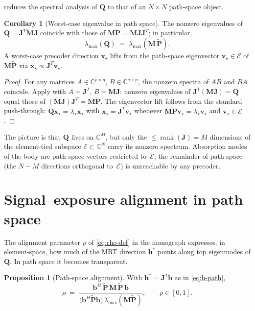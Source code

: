 \documentclass[11pt,a4paper]{article}
\theoremstyle{definition}
\newtheorem{proposition}[proposition]{Proposition}
\newtheorem{corollary}[corollary]{Corollary}
\newcommand{\Complex}{\mathbb{C}}
\newcommand{\Jmat}{\mathbf{J}}                 %
\newcommand{\Mmat}{\mathbf{M}}                 %
\newcommand{\Qmat}{\mathbf{Q}}                 %
\newcommand{\Pmat}{\tilde{\mathbf{P}}}         %
\newcommand{\xx}{\mathbf{x}}
\newcommand{\hh}{\mathbf{h}}
\newcommand{\bvec}{\mathbf{b}}
\begin{document}
 reduces the spectral analysis of $\Qmat$ to that of
an $N\times N$ path-space object.

\begin{corollary}[Worst-case eigenvalue in path space]\label{cor:lam-path}
The nonzero eigenvalues of $\Qmat=\Jmat^T\Mmat\Jmat$ coincide with those
of $\Mmat\Pmat=\Mmat\Jmat\Jmat^T$; in particular,
\begin{equation}\label{eq:lam-path}
  \lambda_{\max}(\Qmat)\;=\;\lambda_{\max}(\Mmat\,\Pmat).
\end{equation}
A worst-case precoder direction $\xx_\star$ lifts from the path-space
eigenvector $\mathbf v_\star\in\mathcal E$ of $\Mmat\Pmat$ via
$\xx_\star\propto\Jmat^T\mathbf v_\star$.
\end{corollary}

\begin{proof}
For any matrices $A\in\Complex^{p\times q}$, $B\in\Complex^{q\times p}$,
the nonzero spectra of $AB$ and $BA$ coincide.  Apply with
$A=\Jmat^T$, $B=\Mmat\Jmat$: nonzero eigenvalues of
$\Jmat^T(\Mmat\Jmat)=\Qmat$ equal those of
$(\Mmat\Jmat)\Jmat^T=\Mmat\Pmat$.  The eigenvector lift follows from
the standard push-through:
$\Qmat\xx_\star=\lambda_\star\xx_\star$ with
$\xx_\star=\Jmat^T\mathbf v_\star$ whenever
$\Mmat\Pmat\mathbf v_\star=\lambda_\star\mathbf v_\star$ and
$\mathbf v_\star\in\mathcal E$.
\end{proof}

The picture is that $\Qmat$ lives on $\Complex^M$, but only the
$\le\operatorname{rank}(\Jmat)=M$ dimensions of the element-tied subspace
$\mathcal E\subset\Complex^N$ carry its nonzero spectrum.  Absorption
modes of the body are path-space vectors restricted to~$\mathcal E$; the
remainder of path space (the $N-M$ directions orthogonal to~$\mathcal E$)
is unreachable by any precoder.

\section{Signal--exposure alignment in path space}\label{sec:rho-path}

The alignment parameter $\rho$ of \cref{eq:rho-def} in the monograph
expresses, in element-space, how much of the MRT direction $\hh^*$ points
along top eigenmodes of $\Qmat$.  In path space it becomes transparent.

\begin{proposition}[Path-space alignment]\label{prop:rho-path}
With $\hh^*=\Jmat^T\bvec$ as in \eqref{eq:h-path},
\begin{equation}\label{eq:rho-path}
  \rho\;=\;\frac{\bvec^H\,\Pmat\,\Mmat\,\Pmat\,\bvec}
  {\bigl(\bvec^H\Pmat\bvec\bigr)\,\lambda_{\max}(\Mmat\Pmat)},
  \qquad \rho\in[0,1].
\end{equation}
\end{proposition}
\end{document}
